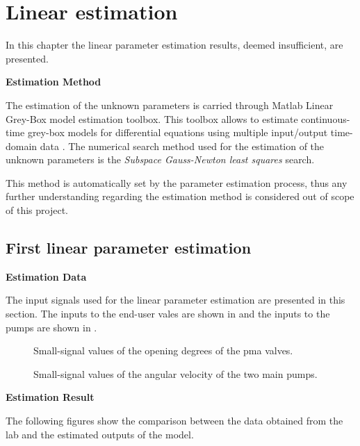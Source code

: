 \chapter{Linear estimation}
\label{LinResults_failed_attempts}
In this chapter the linear parameter estimation results, deemed insufficient, are presented.   

\textbf{Estimation Method}

The estimation of the unknown parameters is carried through Matlab Linear Grey-Box model estimation toolbox. This toolbox allows to estimate continuous-time 
grey-box models for differential equations using multiple input/output time-domain data \cite{LinearEstimation}.
The numerical search method used for the estimation of the unknown parameters is the \textit{Subspace Gauss-Newton least squares} search. 

This method is automatically set by the parameter estimation process, thus any further understanding regarding the estimation method is considered out of 
scope of this project. 

\section{First linear parameter estimation}
\label{LinResults_worst}
\textbf{Estimation Data}

The input signals used for the linear parameter estimation are presented in this section.  
The inputs to the end-user vales are shown in  and the inputs to the pumps are shown in . 


\begin{figure}[H]
  \centering
  \begin{minipage}[b]{0.45\textwidth}
     
    \caption{Small-signal values of the opening degrees of the pma valves. }
    \label{fig:est_OD_data_w}
  \end{minipage}
  \hfill
  \begin{minipage}[b]{0.45\textwidth}
     
    \caption{Small-signal values of the angular velocity of the two main pumps.}
    \label{fig:est_deltap_data_w}
  \end{minipage}
\end{figure}


\textbf{Estimation Result}

The following figures show the comparison between the data obtained from the lab and the estimated outputs of the model.  

